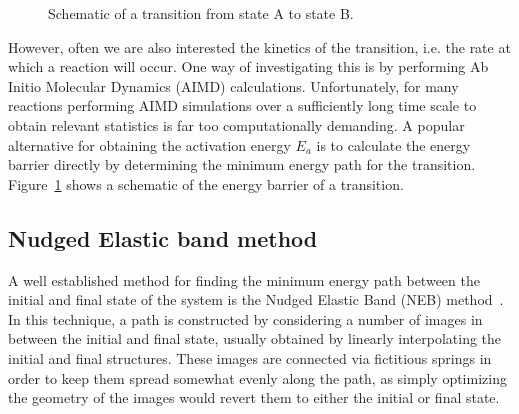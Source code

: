 \begin{refsection}
\begin{figure}[h]

\caption{\label{fig:transition}Schematic of a transition from state A to state B.}
\end{figure}

However, often we are also interested the kinetics of the transition, i.e. the rate at which a reaction will occur. One way of investigating this is by performing Ab Initio Molecular Dynamics (AIMD) calculations. Unfortunately, for many reactions performing AIMD simulations over a sufficiently long time scale to obtain relevant statistics is far too computationally demanding. A popular alternative for obtaining the activation energy $E_a$ is to calculate the energy barrier directly by determining the minimum energy path for the transition. Figure~\ref{fig:transition} shows a schematic of the energy barrier of a transition.

\subsection{Nudged Elastic band method} \label{dft:sec-neb}

A well established method for finding the minimum energy path between the initial and final state of the system is the Nudged Elastic Band (NEB) method~\cite{Jonsson1998, Henkelman2000}. In this technique, a path is constructed by considering a number of images in between the initial and final state, usually obtained by linearly interpolating the initial and final structures. These images are connected via fictitious springs in order to keep them spread somewhat evenly along the path, as simply optimizing the geometry of the images would revert them to either the initial or final state. 


\end{refsection}
